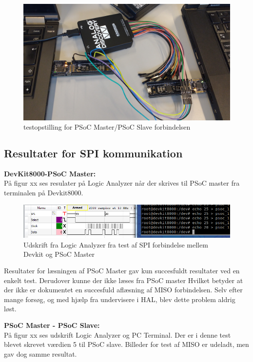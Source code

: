 \begin{figure}[H]
\includegraphics[scale=0.6]{tex/TeImRe/SPI/SPI_testAnalog}
\caption{testopstilling for PSoC Master/PSoC Slave forbindelsen}
\end{figure}

\subsection{Resultater for SPI kommunikation}
\textbf{DevKit8000-PSoC Master:}\\
På figur xx ses resulater på Logic Analyzer når der skrives til PSoC master fra terminalen på Devkit8000.

\begin{figure}[H]
\includegraphics[scale=0.6]{tex/TeImRe/SPI/Analog_devkit_echo_psoc_1}
\caption{Udskrift fra Logic Analyzer fra test af SPI forbindelse mellem Devkit og PSoC Master}
\end{figure}

Resultater for læsningen af PSoC Master gav kun succesfuldt resultater ved en enkelt test. Derudover kunne der ikke læses fra PSoC master
Hvilket betyder at der ikke er dokumentet en succesfuld aflæsning af MISO forbindelsen. Selv efter mange forsøg, og med hjælp fra undervisere i HAL, blev 
dette problem aldrig løst.

\textbf{PSoC Master - PSoC Slave:} \\
På figur xx ses udskrift Logic Analyzer og PC Terminal. Der er i denne test blevet skrevet værdien 5 til PSoC slave. Billeder for test af MISO er udeladt, men
gav dog samme resultat.

